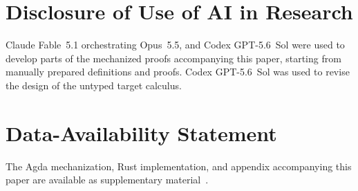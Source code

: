 \begin{abstract}
Context-free session types (CFSTs) support expressive communication
protocols, but programming with them tends to expose the linear
threading of endpoints in both types and terms. This resource-passing
style makes modular session programs cumbersome, especially when a
component uses only a prefix of one or more protocols and returns the
residual endpoints to its caller.

We extend CFSTs with borrowing. A borrow splits a session type into a
borrowed protocol prefix and a residual suffix; for CFSTs, this split
must be computed modulo the equational theory of sequential
composition, choices, skipping behavior, and recursion. The resulting
calculus supports direct-style use of session endpoints while
preserving the linear invariant that communication advances protocol
state.

A key novelty is the distinction between local and remote
borrows. Local borrows remain in one process, where ordered linear typing
guarantees that the borrowed prefix is processed before the residual
suffix. Remote borrows may cross process boundaries; they require explicit
synchronization to ensure that the borrowed prefix is processed before
the residual suffix. The calculus has a direct operational
semantics, an algorithmic type system based on
constraints, and a translation to a lower-level calculus with explicit
synchronization.
\end{abstract}
\maketitle












\section*{Disclosure of Use of AI in Research}

Claude Fable~5.1 orchestrating Opus~5.5, and Codex GPT-5.6~Sol were used to
develop parts of the mechanized proofs
accompanying this paper, starting from manually prepared definitions and
proofs. Codex GPT-5.6~Sol was used to revise the design of the untyped target
calculus. 

\section*{Data-Availability Statement}

The Agda mechanization, Rust implementation, and appendix accompanying this
paper are available as supplementary material~\citep{artifact}.





